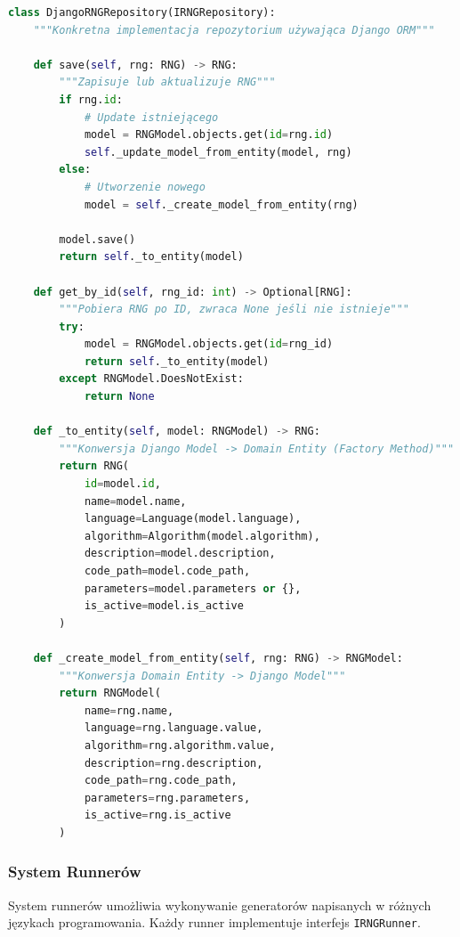 \documentclass[12pt,a4paper]{article}
\begin{document}
\begin{lstlisting}[language=Python, caption=Implementacja DjangoRNGRepository]
class DjangoRNGRepository(IRNGRepository):
    """Konkretna implementacja repozytorium używająca Django ORM"""

    def save(self, rng: RNG) -> RNG:
        """Zapisuje lub aktualizuje RNG"""
        if rng.id:
            # Update istniejącego
            model = RNGModel.objects.get(id=rng.id)
            self._update_model_from_entity(model, rng)
        else:
            # Utworzenie nowego
            model = self._create_model_from_entity(rng)

        model.save()
        return self._to_entity(model)

    def get_by_id(self, rng_id: int) -> Optional[RNG]:
        """Pobiera RNG po ID, zwraca None jeśli nie istnieje"""
        try:
            model = RNGModel.objects.get(id=rng_id)
            return self._to_entity(model)
        except RNGModel.DoesNotExist:
            return None

    def _to_entity(self, model: RNGModel) -> RNG:
        """Konwersja Django Model -> Domain Entity (Factory Method)"""
        return RNG(
            id=model.id,
            name=model.name,
            language=Language(model.language),
            algorithm=Algorithm(model.algorithm),
            description=model.description,
            code_path=model.code_path,
            parameters=model.parameters or {},
            is_active=model.is_active
        )

    def _create_model_from_entity(self, rng: RNG) -> RNGModel:
        """Konwersja Domain Entity -> Django Model"""
        return RNGModel(
            name=rng.name,
            language=rng.language.value,
            algorithm=rng.algorithm.value,
            description=rng.description,
            code_path=rng.code_path,
            parameters=rng.parameters,
            is_active=rng.is_active
        )
\end{lstlisting}

\newpage

\subsubsection{System Runnerów}

System runnerów umożliwia wykonywanie generatorów napisanych w różnych językach programowania. Każdy runner implementuje interfejs \texttt{IRNGRunner}.
\end{document}
